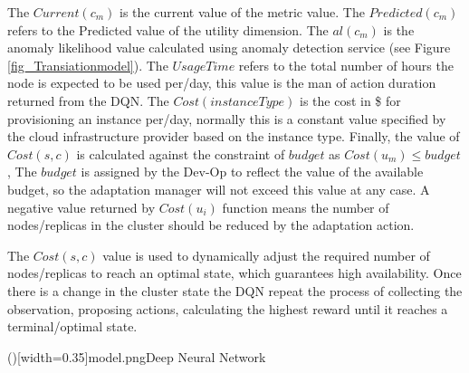 \documentclass{ieeeaccess}
\begin{document}
The $Current(c_{m})$ is the current value of the metric value. The $Predicted(c_{m})$ refers to the Predicted value of the utility dimension. The $al(c_{m})$ is the anomaly likelihood value calculated using anomaly detection service (see Figure \ref{fig_Transiationmodel}). The $UsageTime$ refers to the total number of hours the node is expected to be used per/day, this value is the man of action duration returned from the DQN. The $Cost(instanceType)$ is the cost in \$ for provisioning an instance per/day, normally this is a constant value specified by the cloud infrastructure provider based on the instance type. Finally, the value of $Cost(s, c)$ is calculated against the constraint of $budget$ as $ Cost(u_{m})  \leq  budget $, The $budget$ is assigned by the Dev-Op to reflect the value of the available budget, so the adaptation manager will not exceed this value at any case. A negative value returned by $Cost(u_{i})$ function means the number of nodes/replicas in the cluster should be reduced by the adaptation action.  
 
 
 The $Cost(s, c)$ value is used to dynamically adjust the required number of nodes/replicas to reach an optimal state, which guarantees high availability. Once there is a change in the cluster state the DQN repeat the process of collecting the observation, proposing  actions, calculating the highest reward until it reaches a terminal/optimal state. 

\Figure[!t]()[width=0.35\textwidth]{model.png}{Deep Neural Network \label{fig_dqn}}
   
\end{document}
